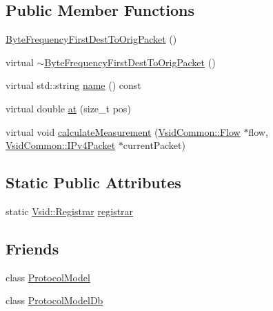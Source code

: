 \subsection*{Public Member Functions}
\begin{DoxyCompactItemize}
\item 
\hyperlink{class_vsid_1_1_byte_frequency_first_dest_to_orig_packet_a5e39abc55ff11705b30279a2ebfcf255}{Byte\-Frequency\-First\-Dest\-To\-Orig\-Packet} ()
\item 
virtual \hyperlink{class_vsid_1_1_byte_frequency_first_dest_to_orig_packet_ab52d66613bb6ff5c45b3a49931e6ed45}{$\sim$\-Byte\-Frequency\-First\-Dest\-To\-Orig\-Packet} ()
\item 
virtual std\-::string \hyperlink{class_vsid_1_1_byte_frequency_first_dest_to_orig_packet_ae284d11d94bbc50a8d573fbdc4e4f1a5}{name} () const 
\item 
virtual double \hyperlink{class_vsid_1_1_byte_frequency_first_dest_to_orig_packet_abf57aa7255bb08e2cc2920154b872232}{at} (size\-\_\-t pos)
\item 
virtual void \hyperlink{class_vsid_1_1_byte_frequency_first_dest_to_orig_packet_a2976d7759672e626bb5d7a971898eec9}{calculate\-Measurement} (\hyperlink{class_vsid_common_1_1_flow}{Vsid\-Common\-::\-Flow} $\ast$flow, \hyperlink{class_vsid_common_1_1_i_pv4_packet}{Vsid\-Common\-::\-I\-Pv4\-Packet} $\ast$current\-Packet)
\end{DoxyCompactItemize}
\subsection*{Static Public Attributes}
\begin{DoxyCompactItemize}
\item 
static \hyperlink{class_vsid_1_1_registrar}{Vsid\-::\-Registrar} \hyperlink{class_vsid_1_1_byte_frequency_first_dest_to_orig_packet_a17fd026aa31ac03feecdd33ea37e9a21}{registrar}
\end{DoxyCompactItemize}
\subsection*{Friends}
\begin{DoxyCompactItemize}
\item 
class \hyperlink{class_vsid_1_1_byte_frequency_first_dest_to_orig_packet_a80219b863d4ff3456933d16bc5f73f45}{Protocol\-Model}
\item 
class \hyperlink{class_vsid_1_1_byte_frequency_first_dest_to_orig_packet_a3c0d389e7a9476b06313d8fb9ca9fe68}{Protocol\-Model\-Db}
\end{DoxyCompactItemize}
